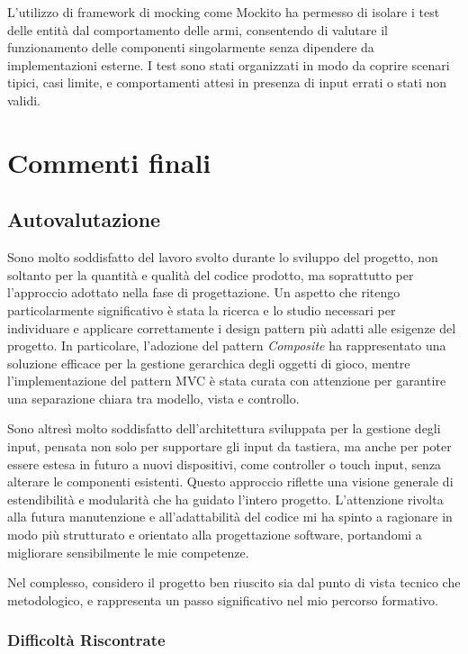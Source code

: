 \documentclass[a4paper,12pt]{report}
\begin{document}
L'utilizzo di framework di mocking come Mockito ha permesso di isolare i test delle entità dal comportamento delle armi, consentendo di valutare il funzionamento delle componenti singolarmente senza dipendere da implementazioni esterne. I test sono stati organizzati in modo da coprire scenari tipici, casi limite, e comportamenti attesi in presenza di input errati o stati non validi.

\chapter{Commenti finali}

\section{Autovalutazione}

Sono molto soddisfatto del lavoro svolto durante lo sviluppo del progetto, non soltanto per la quantità e qualità del codice prodotto, ma soprattutto per l'approccio adottato nella fase di progettazione. Un aspetto che ritengo particolarmente significativo è stata la ricerca e lo studio necessari per individuare e applicare correttamente i design pattern più adatti alle esigenze del progetto. In particolare, l'adozione del pattern \textit{Composite} ha rappresentato una soluzione efficace per la gestione gerarchica degli oggetti di gioco, mentre l'implementazione del pattern MVC è stata curata con attenzione per garantire una separazione chiara tra modello, vista e controllo.

Sono altresì molto soddisfatto dell'architettura sviluppata per la gestione degli input, pensata non solo per supportare gli input da tastiera, ma anche per poter essere estesa in futuro a nuovi dispositivi, come controller o touch input, senza alterare le componenti esistenti. Questo approccio riflette una visione generale di estendibilità e modularità che ha guidato l'intero progetto. L'attenzione rivolta alla futura manutenzione e all'adattabilità del codice mi ha spinto a ragionare in modo più strutturato e orientato alla progettazione software, portandomi a migliorare sensibilmente le mie competenze.

Nel complesso, considero il progetto ben riuscito sia dal punto di vista tecnico che metodologico, e rappresenta un passo significativo nel mio percorso formativo.

\subsection{Difficoltà Riscontrate}
\end{document}
